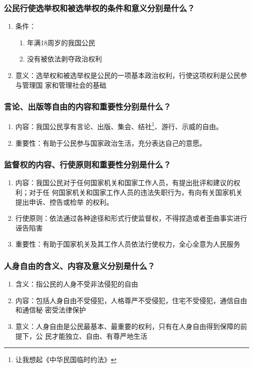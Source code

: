 \documentclass[11pt]{article}
\begin{document}
\subsubsection{公民行使选举权和被选举权的条件和意义分别是什么？}
\label{sec:org1f6b6f0}
\begin{enumerate}
\item 条件：
\begin{enumerate}
\item 年满18周岁的我国公民
\item 没有被依法剥夺政治权利
\end{enumerate}
\item 意义：选举权和被选举权是公民的一项基本政治权利，行使这项权利是公民参与管理国
家和管理社会的基础
\end{enumerate}
\subsubsection{言论、出版等自由的内容和重要性分别是什么？}
\label{sec:orgcbb4251}
\begin{enumerate}
\item 内容：我国公民享有言论、出版、集会、结社\footnote{让我想起《中华民国临时约法》}、游行、示威的自由。
\item 重要性：有助于公民参与国家政治生活，充分表达自己的意愿。
\end{enumerate}
\subsubsection{监督权的内容、行使原则和重要性分别是什么？}
\label{sec:org8ce4a0a}
\begin{enumerate}
\item 内容：我国公民对于任何国家机关和国家工作人员，有提出批评和建议的权利；对于任
何国家机关和国家工作人员的违法失职行为，有向有关国家机关提出申诉、控告或检举
的权利。
\item 行使原则：依法通过各种途径和形式行使监督权，不得捏造或者歪曲事实进行诬告陷害
\item 重要性：有助于国家机关及其工作人员依法行使权力，全心全意为人民服务
\end{enumerate}
\subsubsection{人身自由的含义、内容及意义分别是什么？}
\label{sec:org2118850}
\begin{enumerate}
\item 含义：指公民的人身不受非法侵犯的自由
\item 内容：包括人身自由不受侵犯，人格尊严不受侵犯，住宅不受侵犯，通信自由和通信秘
密受法律保护
\item 意义：人身自由是公民最基本、最重要的权利，只有在人身自由得到保障的前提下，公
民才能独立、自由、有尊严地生活
\end{enumerate}
\end{document}
